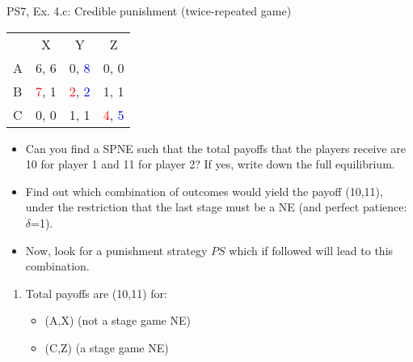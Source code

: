 \begin{frame}{PS7, Ex. 4.c: Credible punishment (twice-repeated game)}
    \vspace{-2pt}
    \begin{table}
      \begin{tabular}{l|c|c|c|}
        \multicolumn{1}{c}{} & \multicolumn{1}{c}{X} & \multicolumn{1}{c}{Y} & \multicolumn{1}{c}{Z}\\\cline{2-4}
        A   & 6, 6 &  0, \textcolor{blue}{8} &  0, 0  \\\cline{2-4}
        B & \textcolor{red}{7}, 1  & \textcolor{red}{2}, \textcolor{blue}{2} &  1, 1  \\\cline{2-4}
        C & 0, 0  & 1, 1 &  \textcolor{red}{4}, \textcolor{blue}{5}  \\\cline{2-4}
      \end{tabular}
    \end{table}
    \vspace{-4pt}
    \begin{itemize}
        \item[(c)] Can you find a SPNE such that the total payoffs that the players receive are 10 for player 1 and 11 for player 2? If yes, write down the full equilibrium.
    \end{itemize}
    \vspace{-8pt}
    \begin{multicols}{2}
      \begin{itemize}
        \item[(Step a)] Find out which combination of outcomes would yield the payoff (10,11), under the restriction that the last stage must be a NE (and perfect patience: $\delta$=1).
        \item[(Step b)] Now, look for a punishment strategy $PS$ which if followed will lead to this combination.
      \end{itemize}
      \vspace{-6pt}
      \vfill\null\columnbreak
      \begin{enumerate}
        \item[a.] Total payoffs are (10,11) for:
        \begin{itemize}\normalsize
          \item[t=1:] (A,X) (not a stage game NE)
          \item[t=2:] (C,Z) (a stage game NE)
        \end{itemize}
      \end{enumerate}
      \vfill\null
    \end{multicols}
\end{frame}
